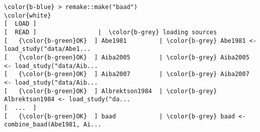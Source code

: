 \documentclass[class=minimal,border=0]{standalone}
\begin{document}
%
\begin{BVerbatim}[bgcolor=b-darkgrey]
\color{b-blue} > remake::make("baad")
\color{white}
[  LOAD ]
[  READ ]                 |  \color{b-grey} loading sources
[   {\color{b-green}OK}  ] Abe1981         | \color{b-grey} Abe1981 <- load_study("data/Abe1...
[   {\color{b-green}OK}  ] Aiba2005        | \color{b-grey} Aiba2005 <- load_study("data/Aib...
[   {\color{b-green}OK}  ] Aiba2007        | \color{b-grey} Aiba2007 <- load_study("data/Aib...
[   {\color{b-green}OK}  ] Albrektson1984  | \color{b-grey} Albrektson1984 <- load_study("da...
[  ...  ]
[   {\color{b-green}OK}  ] baad            | \color{b-grey} baad <- combine_baad(Abe1981, Ai...

\end{BVerbatim}
\end{document}
